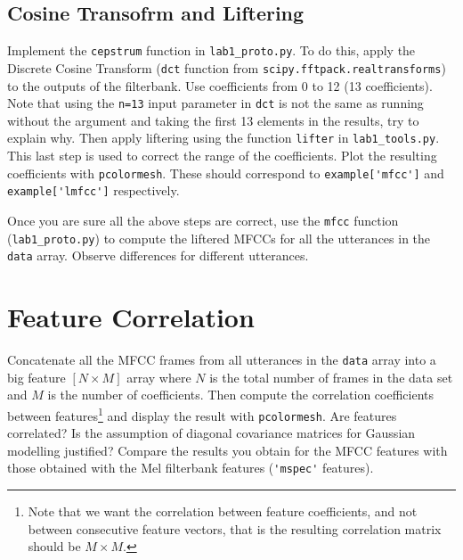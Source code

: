 \documentclass{nada-ten}
\begin{document}
\subsection{Cosine Transofrm and Liftering}
Implement the \texttt{cepstrum} function in \texttt{lab1\_proto.py}. To do this, apply the Discrete Cosine Transform (\texttt{dct} function from \verb|scipy.fftpack.realtransforms|) to the outputs of the filterbank. Use coefficients from 0 to 12 (13 coefficients). Note that using the \texttt{n=13} input parameter in \texttt{dct} is not the same as running without the argument and taking the first 13 elements in the results, try to explain why.  Then apply liftering using the function \verb|lifter| in \texttt{lab1\_tools.py}. This last step is used to correct the range of the coefficients. Plot the resulting coefficients with \texttt{pcolormesh}. These should correspond to \verb|example['mfcc']| and \verb|example['lmfcc']| respectively.

Once you are sure all the above steps are correct, use the \texttt{mfcc} function (\texttt{lab1\_proto.py}) to compute the liftered MFCCs for all the utterances in the \texttt{data} array. Observe differences for different utterances.

\section{Feature Correlation}
Concatenate all the MFCC frames from all utterances in the \texttt{data} array into a big feature $[N \times M]$ array where $N$ is the total number of frames in the data set and $M$ is the number of coefficients. Then compute the correlation coefficients between features\footnote{Note that we want the correlation between feature coefficients, and not between consecutive feature vectors, that is the resulting correlation matrix should be $M\times M$.} and display the result with \texttt{pcolormesh}. Are features correlated? Is the assumption of diagonal covariance matrices for Gaussian modelling justified? Compare the results you obtain for the MFCC features with those obtained with the Mel filterbank features (\verb|'mspec'| features).

\end{document}
